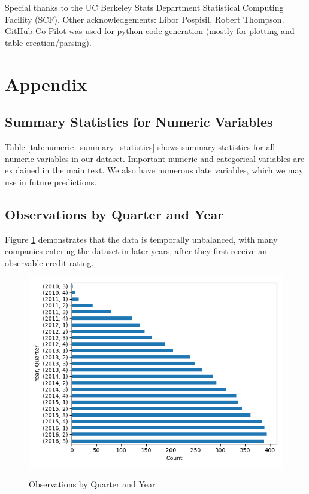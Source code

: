 \documentclass{article}[11pt]
\begin{document}
    Special thanks to the UC Berkeley Stats Department Statistical Computing Facility (SCF). Other acknowledgements: Libor Pospisil, Robert Thompson. GitHub Co-Pilot was used for python code generation (mostly for plotting and table creation/parsing).

    \clearpage
    \newpage

    
    

    \clearpage
    \newpage

    \appendix


    \section{Appendix}

    \subsection{Summary Statistics for Numeric Variables}

    Table \ref{tab:numeric_summary_statistics} shows summary statistics for all numeric variables in our dataset. Important numeric and categorical variables are explained in the main text. We also have numerous date variables, which we may use in future predictions.

    

    \clearpage
    \newpage

    \subsection{Observations by Quarter and Year}

    Figure \ref{fig:obs-by-quarter-year} demonstrates that the data is temporally unbalanced, with many companies entering the dataset in later years, after they first receive an observable credit rating.

    \begin{figure}[h!]
		\centering
        \caption{Observations by Quarter and Year}
        \includegraphics[width=0.6\linewidth,keepaspectratio=true]{../Output/All Data EDA/Tabular EDA/all_data_fixed_quarter_dates_obs_by_year_quarter_no_title.png}
        \label{fig:obs-by-quarter-year}
	\end{figure}
\end{document}
